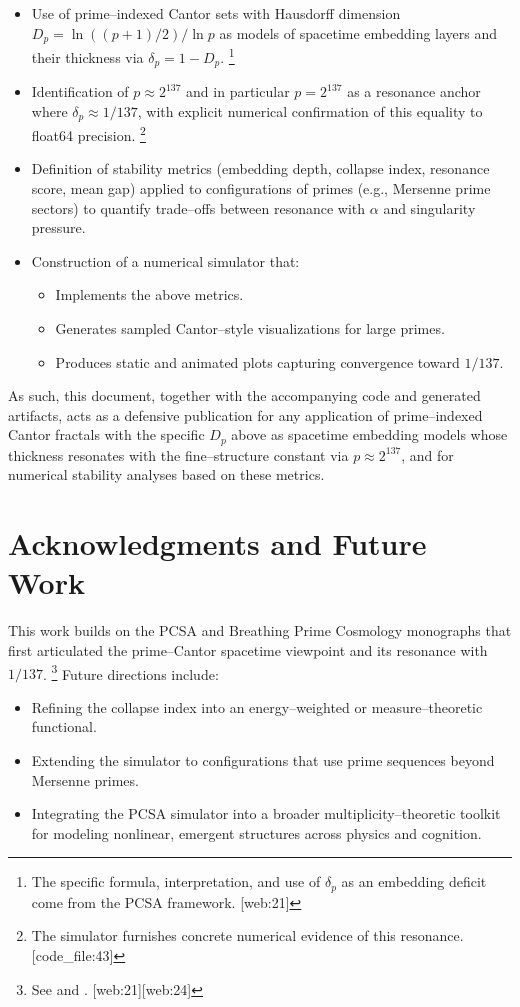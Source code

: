 \documentclass[11pt]{article}
\begin{document}
\begin{itemize}
  \item Use of prime--indexed Cantor sets with Hausdorff dimension $D_p = \ln((p+1)/2)/\ln p$ as models of spacetime embedding layers and their thickness via $\delta_p = 1-D_p$.%
  \footnote{The specific formula, interpretation, and use of $\delta_p$ as an embedding deficit come from the PCSA framework. [web:21]} 
  \item Identification of $p\approx 2^{137}$ and in particular $p = 2^{137}$ as a resonance anchor where $\delta_p \approx 1/137$, with explicit numerical confirmation of this equality to float64 precision.%
  \footnote{The simulator furnishes concrete numerical evidence of this resonance. [code\_file:43]} 
  \item Definition of stability metrics (embedding depth, collapse index, resonance score, mean gap) applied to configurations of primes (e.g., Mersenne prime sectors) to quantify trade--offs between resonance with $\alpha$ and singularity pressure.
  \item Construction of a numerical simulator that:
    \begin{itemize}
      \item Implements the above metrics.
      \item Generates sampled Cantor--style visualizations for large primes.
      \item Produces static and animated plots capturing convergence toward $1/137$.
    \end{itemize}
\end{itemize}

As such, this document, together with the accompanying code and generated artifacts, acts as a defensive publication for any application of prime--indexed Cantor fractals with the specific $D_p$ above as spacetime embedding models whose thickness resonates with the fine--structure constant via $p\approx 2^{137}$, and for numerical stability analyses based on these metrics.

\section*{Acknowledgments and Future Work}

This work builds on the PCSA and Breathing Prime Cosmology monographs that first articulated the prime--Cantor spacetime viewpoint and its resonance with $1/137$.%
\footnote{See \cite{pcsa_gist} and \cite{breathing_prime}. [web:21][web:24]} 
Future directions include:
\begin{itemize}
  \item Refining the collapse index into an energy--weighted or measure--theoretic functional.
  \item Extending the simulator to configurations that use prime sequences beyond Mersenne primes.
  \item Integrating the PCSA simulator into a broader multiplicity--theoretic toolkit for modeling nonlinear, emergent structures across physics and cognition.
\end{itemize}
\end{document}
